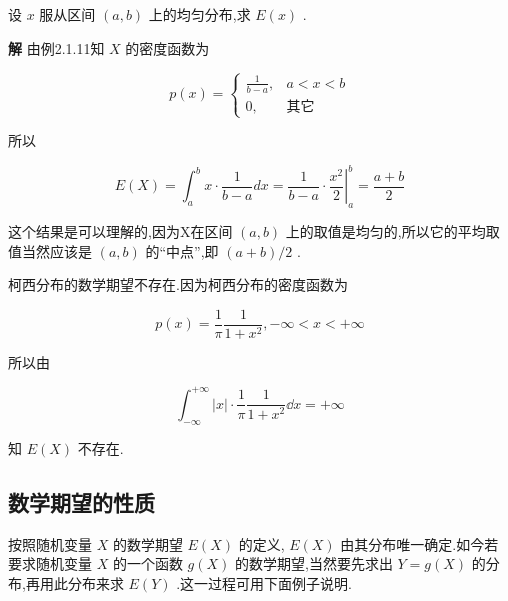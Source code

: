 \begin{example}\label{exam:2.2.4}
	设 $ x $ 服从区间 $ (a,b) $ 上的均匀分布,求 $ E(x) $ .
	
	\textbf{解} 由例2.1.11知 $ X $ 的密度函数为
	
	\[ 
	p(x)=\left\{\begin{array}{ll}
	{\frac{1}{b-a}, }&{a<x<b} \\ {0,}&{\text{其它}}
	\end{array}\right.
	\]
	
	所以
	
	\[ 
	E(X)=\int_{a}^{b} x \cdot \frac{1}{b-a} d x=\frac{1}{b-a} \cdot\left.\frac{x^{2}}{2}\right|_{a} ^{b}=\frac{a+b}{2}
	\]
	
	这个结果是可以理解的,因为X在区间 $ (a,b) $ 上的取值是均匀的,所以它的平均取值当然应该是 $ (a,b) $ 的“中点”,即 $ (a+b)/2 $ .
	
	
\end{example}

\begin{example}\label{exam:2.2.5}
	柯西分布的数学期望不存在.因为柯西分布的密度函数为
	
	\[ 
	p(x)=\frac{1}{\pi} \frac{1}{1+x^{2}},-\infty<x<+\infty
	\]
	
	所以由
	
	\[ 
	\int_{-\infty}^{+\infty}|x| \cdot \frac{1}{\pi} \frac{1}{1+x^{2}} \dd x=+\infty
	\]
	
	知 $ E(X) $ 不存在.
	
\end{example}

\subsection{数学期望的性质}\label{ssec:2.2.3}

按照随机变量 $ X $ 的数学期望 $ E(X) $ 的定义, $ E(X) $ 由其分布唯一确定.如今若要求随机变量 $ X $ 的一个函数 $ g(X) $ 的数学期望,当然要先求出 $ Y=g(X) $ 的分布,再用此分布来求 $ E(Y ) $ .这一过程可用下面例子说明.

